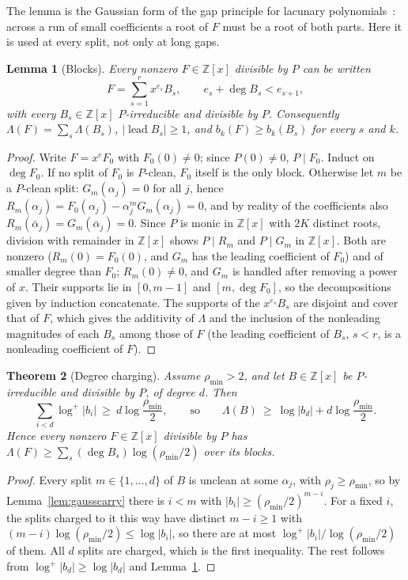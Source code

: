 \documentclass[11pt]{article}
\newtheorem{theorem}{Theorem}[section]
\newtheorem{lemma}[theorem]{Lemma}
\begin{document}
The lemma is the Gaussian form of the gap principle for lacunary
polynomials~\cite{lenstra-lacunary}: across a run of small coefficients a
root of $F$ must be a root of both parts.  Here it is used at every split,
not only at long gaps.

\begin{lemma}[Blocks]\label{lem:gaussblocks}
Every nonzero $F\in\mathbb Z[x]$ divisible by $P$ can be written
\[
  F=\sum_{s=1}^rx^{e_s}B_s,\qquad e_s+\deg B_s<e_{s+1},
\]
with every $B_s\in\mathbb Z[x]$ $P$-irreducible and divisible by $P$.
Consequently $\Lambda(F)=\sum_s\Lambda(B_s)$, $|\operatorname{lead}B_s|\ge1$,
and $b_k(F)\ge b_k(B_s)$ for every $s$ and $k$.
\end{lemma}

\begin{proof}
Write $F=x^eF_0$ with $F_0(0)\ne0$; since $P(0)\ne0$, $P\mid F_0$.  Induct
on $\deg F_0$.  If no split of $F_0$ is $P$-clean, $F_0$ itself is the only
block.  Otherwise let $m$ be a $P$-clean split: $G_m(\alpha_j)=0$ for all
$j$, hence $R_m(\alpha_j)=F_0(\alpha_j)-\alpha_j^mG_m(\alpha_j)=0$, and by
reality of the coefficients also $R_m(\bar\alpha_j)=G_m(\bar\alpha_j)=0$.
Since $P$ is monic in $\mathbb Z[x]$ with $2K$ distinct roots, division with
remainder in $\mathbb Z[x]$ shows $P\mid R_m$ and $P\mid G_m$ in
$\mathbb Z[x]$.  Both are nonzero ($R_m(0)=F_0(0)$, and $G_m$ has the leading
coefficient of $F_0$) and of smaller degree than $F_0$; $R_m(0)\ne0$, and
$G_m$ is handled after removing a power of $x$.  Their supports lie in
$[0,m-1]$ and $[m,\deg F_0]$, so the decompositions given by induction
concatenate.  The supports of the $x^{e_s}B_s$ are disjoint and cover that of
$F$, which gives the additivity of $\Lambda$ and the inclusion of the
nonleading magnitudes of each $B_s$ among those of $F$ (the leading
coefficient of $B_s$, $s<r$, is a nonleading coefficient of $F$).
\end{proof}

\begin{theorem}[Degree charging]\label{thm:gausscharge}
Assume $\rho_{\min}>2$, and let $B\in\mathbb Z[x]$ be $P$-irreducible and
divisible by $P$, of degree $d$.  Then
\[
  \sum_{i<d}\log^+|b_i|\ \ge\ d\log\frac{\rho_{\min}}2,
  \qquad\text{so}\qquad
  \Lambda(B)\ \ge\ \log|b_d|+d\log\frac{\rho_{\min}}2 .
\]
Hence every nonzero $F\in\mathbb Z[x]$ divisible by $P$ has
$\Lambda(F)\ge\sum_s(\deg B_s)\log(\rho_{\min}/2)$ over its blocks.
\end{theorem}

\begin{proof}
Every split $m\in\{1,\ldots,d\}$ of $B$ is unclean at some $\alpha_j$, with
$\rho_j\ge\rho_{\min}$, so by Lemma~\ref{lem:gausscarry} there is $i<m$ with
$|b_i|\ge(\rho_{\min}/2)^{m-i}$.  For a fixed $i$, the splits charged to it
this way have distinct $m-i\ge1$ with
$(m-i)\log(\rho_{\min}/2)\le\log|b_i|$, so there are at most
$\log^+|b_i|/\log(\rho_{\min}/2)$ of them.  All $d$ splits are charged, which
is the first inequality.  The rest follows from $\log^+|b_d|\ge\log|b_d|$ and
Lemma~\ref{lem:gaussblocks}.
\end{proof}
\end{document}
